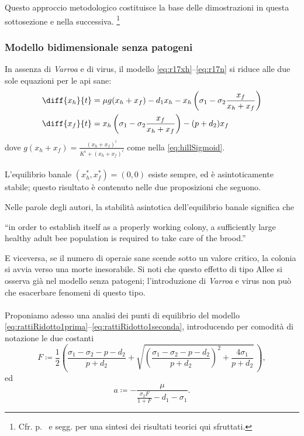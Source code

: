 Questo approccio metodologico costituisce la base delle dimostrazioni in questa sottosezione e nella successiva.
\footnote{Cfr. p.~\pageref{chap:teoria} e segg. per una sintesi dei risultati teorici qui sfruttati.}

\subsubsection{Modello bidimensionale senza patogeni}
In assenza di \emph{Varroa} e di virus, il modello \eqref{eq:r17xh}--\eqref{eq:r17n} si riduce alle due sole equazioni per le api sane:
\begin{align}
    \diff{x_h}{t} &= \mu g( x_h + x_f ) - d_1 x_h - x_h \left( \sigma_1 - \sigma_2 \frac{x_f}{x_h + x_f} \right)
    \label{eq:rattiRidotto1prima}
    \\
    \diff{x_f}{t} &= x_h \left( \sigma_1 - \sigma_2 \frac{x_f}{x_h + x_f} \right) - (p + d_2) x_f
    \label{eq:rattiRidotto1seconda}
\end{align}
dove $g(x_h + x_f) = \frac{ (x_h+x_f)^i }{ K^i + (x_h+x_f)^i }$ come nella \eqref{eq:hillSigmoid}.

\paragraph{}
L'equilibrio banale $(x_h^*, x_f^*) = (0,0)$ esiste sempre, ed è asintoticamente stabile; questo risultato è contenuto nelle due proposizioni che seguono.

Nelle parole degli autori, la stabilità asintotica dell'equilibrio banale significa che
\begin{displayquote}
``\omissis in order to establish itself as a properly working colony, a sufficiently large healthy adult bee population is required to take care of the brood.''
\end{displayquote}

E viceversa, se il numero di operaie sane scende sotto un valore critico, la colonia si avvia verso una morte inesorabile.
Si noti che questo effetto di tipo Allee si osserva già nel modello senza patogeni; l'introduzione di \emph{Varroa} e virus non può che esacerbare fenomeni di questo tipo.

\paragraph{}
Proponiamo adesso una analisi dei punti di equilibrio del modello \eqref{eq:rattiRidotto1prima}--\eqref{eq:rattiRidotto1seconda}, introducendo per comodità di notazione le due costanti
$$
    F \coloneq \frac{1}{2} \left( \frac{ \sigma_1 - \sigma_2 - p - d_2 }{p+d_2} +
    \sqrt{ {\left( \frac{ \sigma_1 - \sigma_2 - p - d_2 }{p+d_2} \right)}^2 + \frac{4 \sigma_1}{p+d_2} } \, \right),
$$
ed
$$ a \coloneq - \frac{ \mu }{ \frac{\sigma_2 F}{1+F} - d_1 - \sigma_1 }.$$

